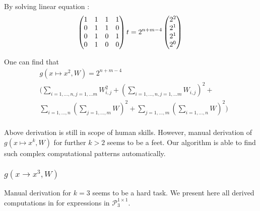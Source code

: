  By solving linear equation :
 \begin{equation}
 \begin{pmatrix} 
  1 & 1 & 1 & 1 \\ 
  0 & 1 & 1 & 0 \\ 
  0 & 1 & 0 & 1 \\ 
  0 & 1 & 0 & 0 \\     
\end{pmatrix}t = 2^{n + m - 4}\begin{pmatrix} 
  2^{2}\\ 
  2^{1}\\ 
  2^{1}\\ 
  2^{0}\\     
\end{pmatrix} \\
 \end{equation}

One can find that 
\begin{align*}
	&g(x \mapsto x^2, W) = 2^{n + m - 4} \\ 
 &\Big(\sum_{i = 1, \dots, n, j = 1, \dots m} W_{i, j}^2 + (\sum_{i = 1, \dots, n, j = 1, \dots m} W_{i, j})^2 + \\
 &\sum_{i = 1, \dots, n}(\sum_{j = 1, \dots, m} W)^2 + \sum_{j = 1, \dots, m}(\sum_{i = 1, \dots, n} W)^2 \Big)\\
\end{align*}

Above derivation is still in scope of human skills. However, manual derivation
of $g(x \mapsto x^k, W)$ for further $k > 2$  seems to be a feet. Our algorithm
is able to find such complex computational patterns automatically. 

\subsubsection{$g(x \rightarrow x^3, W)$}
Manual derivation for $k = 3$ seems to be a hard task. We present here all derived computations in
for expressions in $\mathcal{P}^{1 \times 1}_3$. 

